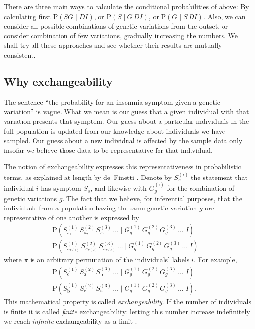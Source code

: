 \documentclass[\ifafour a4paper,12pt,\else a5paper,10pt,\fi%
onecolumn,oneside,article,%
british%
]{memoir}
\theoremstyle{remark}
\theoremstyle{innote}
\newcommand*{\citep}{\parencites}
\newcommand*{\citey}{\parencites*}
\newcommand*{\p}{\mathrm{P}}%
\renewcommand*{\|}{\mathpunct{|}}
\newcommand*{\yD}{D}
\newcommand*{\yG}{G}
\newcommand*{\yS}{S}
\newcommand*{\yI}{I}
\newcommand*{\yGi}[1]{G^{(#1)}}
\newcommand*{\ySi}[1]{S^{(#1)}}
\begin{document}
There are three main ways to calculate the conditional probabilities of
above: By calculating first $\p(\yS\yG \|\yD\yI)$,
or $\p(\yS \|\yG\,\yD\yI)$, or $\p(\yG \|\yS\,\yD\yI)$. Also, we can
consider all possible combinations of genetic variations from the outset,
or consider combination of few variations, gradually increasing the
numbers. We shall try all these approaches and see whether their results
are mutually consistent.


\subsection{Why exchangeability}
\label{sec:why_exchangeability}



The sentence \enquote{the probability for an insomnia symptom given a
  genetic variation} is vague. What we mean is our guess that a given
individual with that variation presents that symptom. Our guess about a
particular individuals in the full population is updated from our knowledge
about individuals we have sampled. Our guess about a new individual is
affected by the sample data only insofar we believe those data to be
representative for that individual.

The notion of exchangeability expresses this representativeness in
probabilistic terms, as explained at length by de~Finetti
\citey{definetti1931,definetti1937,definetti1938}. Denote by $\ySi{i}_s$
the statement that individual $i$ has symptom $\yS_s$, and likewise with
$\yGi{i}_g$ for the combination of genetic variations $g$. The fact that we
believe, for inferential purposes, that the individuals from a population
having the same genetic variation $g$ are representative of one another is
expressed by
\begin{multline}
\label{def_exchangeability}
  \p(\ySi{1}_{s_1}\, \ySi{2}_{s_2}\, \ySi{3}_{s_3}\,\dotso \|
  \yGi{1}_{g}\, \yGi{2}_{g}\, \yGi{3}_{g}\,\dotso
  \;\yI)
  ={}\\
  \p(\ySi{1}_{s_{\pi(1)}}\, \ySi{2}_{s_{\pi(2)}}\, \ySi{3}_{s_{\pi(3)}}\,\dotso \|
  \yGi{1}_{g}\, \yGi{2}_{g}\, \yGi{3}_{g}\,\dotso
  \;\yI)
\end{multline}
where $\pi$ is an arbitrary permutation of the individuals' labels $i$. For
example,
\begin{multline}
\label{example_exchangeability}
  \p(\ySi{1}_{\text{c}}\, \ySi{2}_{\text{a}}\, \ySi{3}_{\text{b}}\,\dotso \|
  \yGi{1}_{g}\, \yGi{2}_{g}\, \yGi{3}_{g}\,\dotso
  \;\yI)
  ={}\\
  \p(\ySi{1}_{\text{b}}\, \ySi{2}_{\text{c}}\, \ySi{3}_{\text{a}}\,\dotso \|
  \yGi{1}_{g}\, \yGi{2}_{g}\, \yGi{3}_{g}\,\dotso
  \;\yI).
\end{multline}
This mathematical property is called \emph{exchangeability}.
If the number of individuals is finite it is called \emph{finite}
exchangeability; letting this number increase indefinitely we reach
\emph{infinite} exchangeability as a limit \citep{heathetal1976}.
\end{document}

